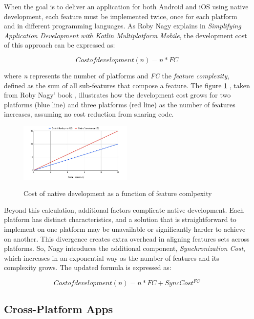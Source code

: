 When the goal is to deliver an application for both Android and iOS using native development, each feature must be implemented twice, once for each platform and in different programming languages.
As Roby Nagy explains in \textit{Simplifying Application Development with Kotlin Multiplatform Mobile}\cite{Nagy2022}, the development cost of this approach can be expressed as:


\[Cost of development (n) = n * FC\]

where \textit{n} represents the number of platforms and \textit{FC} the \textit{feature complexity}, defined as the sum of all sub-features that compose a feature.
The figure \ref{fig:costNative} , taken from Roby Nagy' book \cite{Nagy2022}, illustrates how the development cost grows for two platforms (blue line) and three platforms (red line) as the number of features increases, assuming no cost reduction from sharing code.

\begin{figure}[h]
    \caption{Cost of native development as a function of feature comlpexity \cite{Nagy2022}}
    \centering
    \includegraphics[width=0.5\textwidth]{figs/Figure_1.1_B17614_cost_of_native_dev}
    \label{fig:costNative}
\end{figure}


Beyond this calculation, additional factors complicate native development.
Each platform has distinct characteristics, and a solution that is straightforward to implement on one platform may be unavailable or significantly harder to achieve on another.
This divergence creates extra overhead in aligning features sets across platforms.
So, Nagy introduces the additional component, \textit{Synchronization Cost}, which increases in an exponential way as the number of features and its complexity grows.
The updated formula is expressed as:

\[Cost of development (n) = n * FC + Sync Cost ^ {FC}\]



\subsection{Cross-Platform Apps}\label{subsec:cross-platform-apps}

